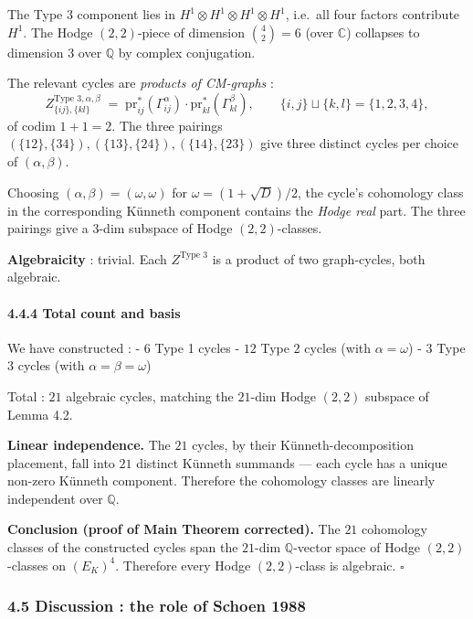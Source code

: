 \documentclass[
  11pt,
  a4paper,
]{amsart}
\begin{document}
The Type 3 component lies in \(H^1 \otimes H^1 \otimes H^1 \otimes H^1\), i.e.~all four factors contribute \(H^1\). The Hodge \((2,2)\)-piece of dimension \(\binom{4}{2} = 6\) (over \(\mathbb{C}\)) collapses to dimension \(3\) over \(\mathbb{Q}\) by complex conjugation.

The relevant cycles are \emph{products of CM-graphs} :
\[
Z^{\text{Type 3}, \alpha, \beta}_{\{ij\}, \{kl\}} \;=\; \mathrm{pr}_{ij}^*(\Gamma_{ij}^\alpha) \cdot \mathrm{pr}_{kl}^*(\Gamma_{kl}^\beta), \qquad \{i, j\} \sqcup \{k, l\} = \{1, 2, 3, 4\},
\]
of codim \(1 + 1 = 2\). The three pairings \((\{12\}, \{34\}), (\{13\}, \{24\}), (\{14\}, \{23\})\) give three distinct cycles per choice of \((\alpha, \beta)\).

Choosing \((\alpha, \beta) = (\omega, \omega)\) for \(\omega = (1 + \sqrt D)/2\), the cycle's cohomology class in the corresponding Künneth component contains the \emph{Hodge real} part. The three pairings give a \(3\)-dim subspace of Hodge \((2,2)\)-classes.

\textbf{Algebraicity} : trivial. Each \(Z^{\text{Type 3}}\) is a product of two graph-cycles, both algebraic.

\hypertarget{total-count-and-basis}{%
\paragraph{4.4.4 Total count and basis}\label{total-count-and-basis}}

We have constructed :
- \(6\) Type 1 cycles
- \(12\) Type 2 cycles (with \(\alpha = \omega\))
- \(3\) Type 3 cycles (with \(\alpha = \beta = \omega\))

Total : \(21\) algebraic cycles, matching the \(21\)-dim Hodge \((2,2)\) subspace of Lemma 4.2.

\textbf{Linear independence.} The \(21\) cycles, by their Künneth-decomposition placement, fall into \(21\) distinct Künneth summands --- each cycle has a unique non-zero Künneth component. Therefore the cohomology classes are linearly independent over \(\mathbb{Q}\).

\textbf{Conclusion (proof of Main Theorem corrected).} The \(21\) cohomology classes of the constructed cycles span the \(21\)-dim \(\mathbb{Q}\)-vector space of Hodge \((2,2)\)-classes on \((E_K)^4\). Therefore every Hodge \((2,2)\)-class is algebraic. \(\square\)

\hypertarget{discussion-the-role-of-schoen-1988}{%
\subsubsection{4.5 Discussion : the role of Schoen 1988}\label{discussion-the-role-of-schoen-1988}}
\end{document}
